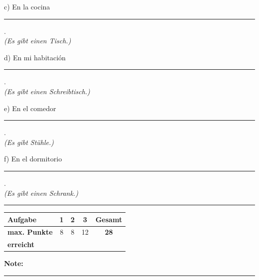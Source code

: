 \documentclass[11pt, a4paper]{article}
\newcommand{\luecke}[1]{\rule{#1}{0.4pt}}
\begin{document}
\noindent
c) En la cocina \luecke{5cm}. \\
\hspace*{0.5cm}\textit{(Es gibt einen Tisch.)}

\vspace{0.8em}

\noindent
d) En mi habitación \luecke{5cm}. \\
\hspace*{0.5cm}\textit{(Es gibt einen Schreibtisch.)}

\vspace{0.8em}

\noindent
e) En el comedor \luecke{5cm}. \\
\hspace*{0.5cm}\textit{(Es gibt Stühle.)}

\vspace{0.8em}

\noindent
f) En el dormitorio \luecke{5cm}. \\
\hspace*{0.5cm}\textit{(Es gibt einen Schrank.)}


\vspace{25pt}
\hrule
\vspace{10pt}

\noindent
\begin{tabularx}{\textwidth}{|X|c|c|c||c|}
\hline
\textbf{Aufgabe} & 1 & 2 & 3 & \textbf{Gesamt} \\
\hline
\textbf{max. Punkte} & 8 & 8 & 12 & \textbf{28} \\
\hline
\textbf{erreicht} & & & & \\[0.8em]
\hline
\end{tabularx}

\vspace{10pt}

\begin{flushright}
\textbf{Note:} \luecke{2cm}
\end{flushright}
\end{document}
